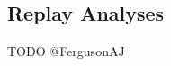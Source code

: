 \subsection{Replay Analyses}
\label{sec:replay}

TODO @FergusonAJ \citet{ferguson2023potentiating,ferguson2027identifying}
